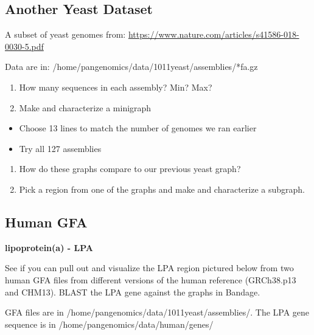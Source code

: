 \documentclass[
]{book}
\providecommand{\tightlist}{%
  \setlength{\itemsep}{0pt}\setlength{\parskip}{0pt}}
\begin{document}
\hypertarget{another-yeast-dataset}{%
\subsection*{Another Yeast Dataset}\label{another-yeast-dataset}}

A subset of yeast genomes from: \url{https://www.nature.com/articles/s41586-018-0030-5.pdf}

Data are in: /home/pangenomics/data/1011yeast/assemblies/*fa.gz

\begin{enumerate}
\def\labelenumi{\arabic{enumi}.}
\tightlist
\item
  How many sequences in each assembly? Min? Max?
\item
  Make and characterize a minigraph
\end{enumerate}

\begin{itemize}
\tightlist
\item
  Choose 13 lines to match the number of genomes we ran earlier\\
\item
  Try all 127 assemblies\\
\end{itemize}

\begin{enumerate}
\def\labelenumi{\arabic{enumi}.}
\setcounter{enumi}{2}
\tightlist
\item
  How do these graphs compare to our previous yeast graph?
\item
  Pick a region from one of the graphs and make and characterize a subgraph.
\end{enumerate}

\hypertarget{human-gfa}{%
\subsection*{Human GFA}\label{human-gfa}}

\textbf{lipoprotein(a) - LPA}

See if you can pull out and visualize the LPA region pictured below from two human GFA files from different versions of the human reference (GRCh38.p13 and CHM13). BLAST the LPA gene against the graphs in Bandage.

GFA files are in /home/pangenomics/data/1011yeast/assemblies/. The LPA gene sequence is in /home/pangenomics/data/human/genes/
\end{document}

